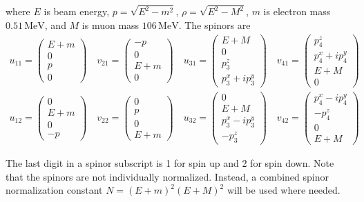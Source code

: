 \documentclass[12pt]{article}
\begin{document}
\noindent
where $E$ is beam energy, $p=\sqrt{E^2-m^2}$, $\rho=\sqrt{E^2-M^2}$,
$m$ is electron mass $0.51\,\text{MeV}$,
and $M$ is muon mass $106\,\text{MeV}$.
The spinors are
\begin{gather*}
u_{11}=\begin{pmatrix}E+m\\0\\p\\0\end{pmatrix}\quad
v_{21}=\begin{pmatrix}-p\\0\\E+m\\0\end{pmatrix}\quad
u_{31}=\begin{pmatrix}E+M\\0\\p_3^z\\p_3^x+ip_3^y\end{pmatrix}\quad
v_{41}=\begin{pmatrix}p_4^z\\p_4^x+ip_4^y\\E+M\\0\end{pmatrix}
\\
u_{12}=\begin{pmatrix}0\\E+m\\0\\-p\end{pmatrix}\quad
v_{22}=\begin{pmatrix}0\\p\\0\\E+m\end{pmatrix}\quad
u_{32}=\begin{pmatrix}0\\E+M\\p_3^x-ip_3^y\\-p_3^z\end{pmatrix}\quad
v_{42}=\begin{pmatrix}p_4^x-ip_4^y\\-p_4^z\\0\\E+M\end{pmatrix}
\end{gather*}

\noindent
The last digit in a spinor subscript is 1 for spin up and 2 for spin down.
Note that the spinors are not individually normalized.
Instead, a combined spinor normalization constant $N=(E+m)^2(E+M)^2$
will be used where needed.
\end{document}
